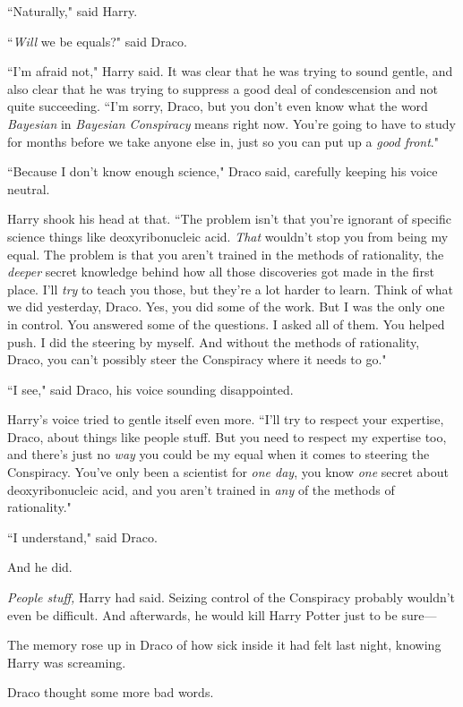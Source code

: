 ``Naturally," said Harry.

``\emph{Will} we be equals?" said Draco.

``I'm afraid not," Harry said. It was clear that he was trying to sound gentle, and also clear that he was trying to suppress a good deal of condescension and not quite succeeding. ``I'm sorry, Draco, but you don't even know what the word \emph{Bayesian} in \emph{Bayesian Conspiracy} means right now. You're going to have to study for months before we take anyone else in, just so you can put up a \emph{good front}."

``Because I don't know enough science," Draco said, carefully keeping his voice neutral.

Harry shook his head at that. ``The problem isn't that you're ignorant of specific science things like deoxyribonucleic acid. \emph{That} wouldn't stop you from being my equal. The problem is that you aren't trained in the methods of rationality, the \emph{deeper} secret knowledge behind how all those discoveries got made in the first place. I'll \emph{try} to teach you those, but they're a lot harder to learn. Think of what we did yesterday, Draco. Yes, you did some of the work. But I was the only one in control. You answered some of the questions. I asked all of them. You helped push. I did the steering by myself. And without the methods of rationality, Draco, you can't possibly steer the Conspiracy where it needs to go."

``I see," said Draco, his voice sounding disappointed.

Harry's voice tried to gentle itself even more. ``I'll try to respect your expertise, Draco, about things like people stuff. But you need to respect my expertise too, and there's just no \emph{way} you could be my equal when it comes to steering the Conspiracy. You've only been a scientist for \emph{one day}, you know \emph{one} secret about deoxyribonucleic acid, and you aren't trained in \emph{any} of the methods of rationality."

``I understand," said Draco.

And he did.

\emph{People stuff,} Harry had said. Seizing control of the Conspiracy probably wouldn't even be difficult. And afterwards, he would kill Harry Potter just to be sure—

The memory rose up in Draco of how sick inside it had felt last night, knowing Harry was screaming.

Draco thought some more bad words.

